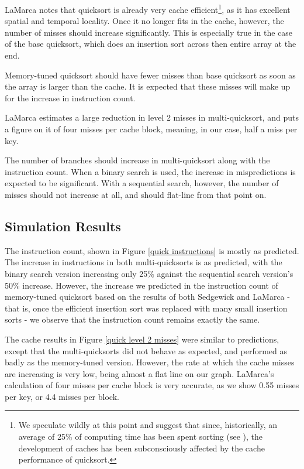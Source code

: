 LaMarca notes that quicksort is already very cache efficient\footnote{We
speculate wildly at this point and suggest that since, historically, an average
of 25\% of computing time has been spent sorting (see \cite[Page 3]{Knuth97}),
the development of caches has been subconsciously affected by the cache
performance of quicksort.}, as it has excellent spatial and temporal locality.
Once it no longer fits in the cache, however, the number of misses should
increase significantly. This is especially true in the case of the base
quicksort, which does an insertion sort across then entire array at the end.

Memory-tuned quicksort should have fewer misses than base quicksort as soon as
the array is larger than the cache. It is expected that these misses will make
up for the increase in instruction count.

LaMarca estimates a large reduction in level 2 misses in multi-quicksort, and
puts a figure on it of four misses per cache block, meaning, in our case, half a
miss per key.

The number of branches should increase in multi-quicksort along with the
instruction count. When a binary search is used, the increase in mispredictions
is expected to be significant. With a sequential search, however, the number of
misses should not increase at all, and should flat-line from that point on.

\subsection{Simulation Results}


The instruction count, shown in Figure \ref{quick instructions} is mostly as
predicted. The increase in instructions in both multi-quicksorts is as
predicted, with the binary search version increasing only 25\% against the
sequential search version's 50\% increase. However, the increase we predicted in
the instruction count of memory-tuned quicksort based on the results of both
Sedgewick and LaMarca - that is, once the efficient insertion sort was replaced
with many small insertion sorts - we observe that the instruction count remains
exactly the same.

The cache results in Figure \ref{quick level 2 misses} were similar to
predictions, except that the multi-quicksorts did not behave as expected, and
performed as badly as the memory-tuned version. However, the rate at which the
cache misses are increasing is very low, being almost a flat line on our graph.
LaMarca's calculation of four misses per cache block is very accurate, as we
show 0.55 misses per key, or 4.4 misses per block.

